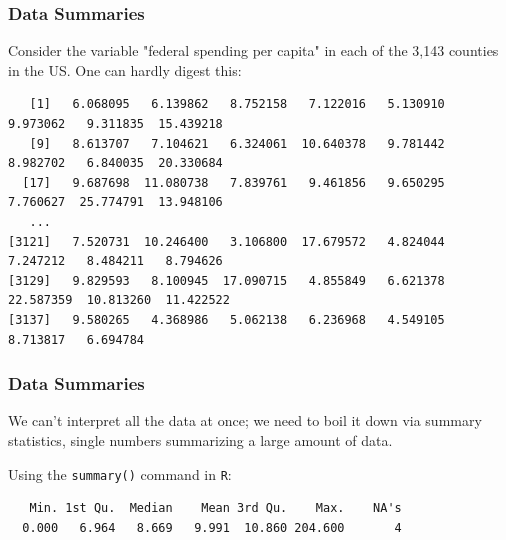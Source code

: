 \documentclass[handout]{beamer}
\newcommand{\blue}[1]{\textcolor{blue2}{#1}}
\begin{document}
\begin{frame}[fragile]
\frametitle{Data Summaries}

Consider the variable "federal spending per capita" in each of the 3,143 counties in the US.  One can hardly digest this:

\begin{tiny}
\begin{verbatim}
   [1]   6.068095   6.139862   8.752158   7.122016   5.130910   9.973062   9.311835  15.439218
   [9]   8.613707   7.104621   6.324061  10.640378   9.781442   8.982702   6.840035  20.330684
  [17]   9.687698  11.080738   7.839761   9.461856   9.650295   7.760627  25.774791  13.948106
   ...
[3121]   7.520731  10.246400   3.106800  17.679572   4.824044   7.247212   8.484211   8.794626
[3129]   9.829593   8.100945  17.090715   4.855849   6.621378  22.587359  10.813260  11.422522
[3137]   9.580265   4.368986   5.062138   6.236968   4.549105   8.713817   6.694784
\end{verbatim}
\end{tiny}

\end{frame}




\begin{frame}[fragile]
\frametitle{Data Summaries}
We can't interpret all the data at once; we need to boil it down via \blue{summary statistics}, single numbers summarizing a large amount of data.

\vspace{0.5cm}

\pause Using the \verb#summary()# command in \verb#R#:

\begin{small}
\begin{verbatim}
   Min. 1st Qu.  Median    Mean 3rd Qu.    Max.    NA's 
  0.000   6.964   8.669   9.991  10.860 204.600       4 
\end{verbatim}
\end{small}


\end{frame}
\end{document}

